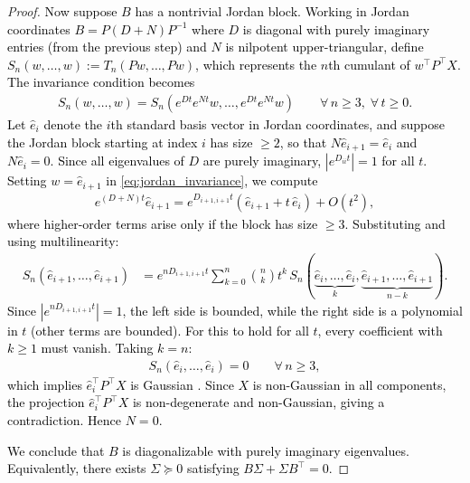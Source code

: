\documentclass[twoside,11pt]{article}
\newcommand{\rv}[1]{\textcolor{black}{#1}}
\begin{document}
\begin{proof}
\rv{Now suppose $B$ has a nontrivial Jordan block. Working in Jordan 
coordinates $B = P(D + N)P^{-1}$ where $D$ is diagonal with purely 
imaginary entries (from the previous step) and $N$ is nilpotent 
upper-triangular, define $S_n(w, \ldots, w) := T_n(Pw, \ldots, Pw)$, 
which represents the $n$th cumulant of $w^\top P^\top X$. The 
invariance condition becomes
\begin{align}
    S_n(w, \ldots, w) = S_n(e^{Dt}e^{Nt}w, \ldots, e^{Dt}e^{Nt}w) 
    \qquad \forall\, n \ge 3,\; \forall\, t \ge 0.
    \label{eq:jordan_invariance}
\end{align}
Let $\hat{e}_i$ denote the $i$th standard basis vector in Jordan 
coordinates, and suppose the Jordan block starting at index $i$ has 
size $\ge 2$, so that $N\hat{e}_{i+1} = \hat{e}_i$ and 
$N\hat{e}_i = 0$. Since all eigenvalues of $D$ are purely imaginary, 
$|e^{D_{ii}t}| = 1$ for all $t$. Setting $w = \hat{e}_{i+1}$ in \eqref{eq:jordan_invariance}, we 
compute
\begin{align*}
    e^{(D+N)t}\hat{e}_{i+1} = e^{D_{i+1,i+1}t}(\hat{e}_{i+1} 
    + t\,\hat{e}_i) + O(t^2),
\end{align*}
where higher-order terms arise only if the block has size $\ge 3$. 
Substituting and using multilinearity:
\begin{align*}
    S_n(\hat{e}_{i+1}, \ldots, \hat{e}_{i+1}) 
    &= e^{nD_{i+1,i+1}t}\sum_{k=0}^{n}\binom{n}{k}t^k\, 
    S_n(\underbrace{\hat{e}_i, \ldots, \hat{e}_i}_{k}, 
    \underbrace{\hat{e}_{i+1}, \ldots, \hat{e}_{i+1}}_{n-k}).
\end{align*}
Since $|e^{nD_{i+1,i+1}t}| = 1$, the left side is bounded, while 
the right side is a polynomial in $t$ (other terms are bounded). For this to hold for all $t$, every coefficient with 
$k \ge 1$ must vanish. Taking $k = n$:
\begin{align*}
    S_n(\hat{e}_i, \ldots, \hat{e}_i) = 0 \qquad \forall\, n \ge 3,
\end{align*}
which implies $\hat{e}_i^\top P^\top X$ is Gaussian \citep{marcinkiewicz1939propriete}. Since $X$ is 
non-Gaussian in all components, the projection $\hat{e}_i^\top 
P^\top X$ is non-degenerate and non-Gaussian, giving a 
contradiction. Hence $N = 0$.}

\rv{We conclude that $B$ is diagonalizable with purely imaginary 
eigenvalues. Equivalently, there exists $\Sigma \succeq 0$ satisfying 
$B\Sigma + \Sigma B^\top = 0$.}


\end{proof}
\end{document}
